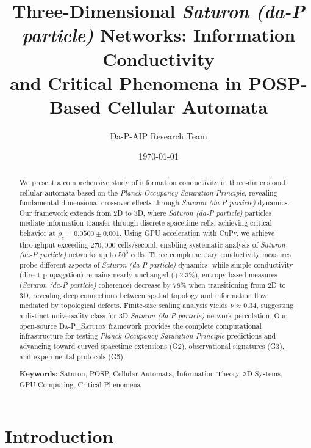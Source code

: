 \documentclass[twocolumn,showpacs,preprintnumbers,amsmath,amssymb,prb]{revtex4-2}
\newcommand{\satulon}{\textsc{Da-P\_Satulon}}
\newcommand{\saturon}{\textit{Saturon (da-P particle)}}
\newcommand{\posp}{\textit{Planck-Occupancy Saturation Principle}}
\begin{document}

\title{Three-Dimensional \saturon{} Networks: Information Conductivity \\
and Critical Phenomena in POSP-Based Cellular Automata}

\author{Da-P-AIP Research Team}

\date{\today}

\begin{abstract}
We present a comprehensive study of information conductivity in three-dimensional cellular automata based on the \posp{}, revealing fundamental dimensional crossover effects through \saturon{} dynamics. Our framework extends from 2D to 3D, where \saturon{} particles mediate information transfer through discrete spacetime cells, achieving critical behavior at $\rho_c = 0.0500 \pm 0.001$. Using GPU acceleration with CuPy, we achieve throughput exceeding $270,000$ cells/second, enabling systematic analysis of \saturon{} networks up to $50^3$ cells. Three complementary conductivity measures probe different aspects of \saturon{} dynamics: while simple conductivity (direct propagation) remains nearly unchanged ($+2.3\%$), entropy-based measures (\saturon{} coherence) decrease by $78\%$ when transitioning from 2D to 3D, revealing deep connections between spatial topology and information flow mediated by topological defects. Finite-size scaling analysis yields $\nu \approx 0.34$, suggesting a distinct universality class for 3D \saturon{} network percolation. Our open-source \satulon{} framework provides the complete computational infrastructure for testing \posp{} predictions and advancing toward curved spacetime extensions (G2), observational signatures (G3), and experimental protocols (G5).

\textbf{Keywords:} Saturon, POSP, Cellular Automata, Information Theory, 3D Systems, GPU Computing, Critical Phenomena
\end{abstract}


\maketitle

\section{Introduction}
\label{sec:introduction}
\end{document}

